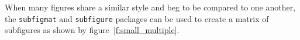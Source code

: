 \documentclass[draft]{aiaa-tc}%
\newcommand{\package}[1]{\texttt{#1}}
\begin{document}
When many figures share a similar style and beg to be compared to one
another, the \package{subfigmat} and \package{subfigure} packages can be
used to create a matrix of subfigures as shown by
figure~\vref{f:small_multiple}.
\begin{figure}
 \begin{subfigmatrix}{4}%

\end{subfigmatrix}
\end{figure}
\end{document}
